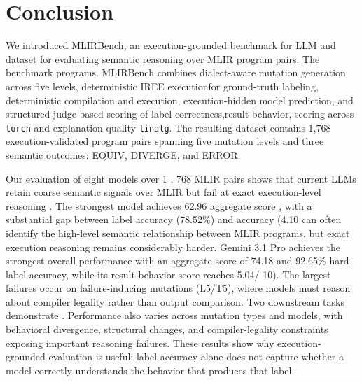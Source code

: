\documentclass[sigplan,screen,review,anonymous]{acmart}
\providecommand{\DIFadd}[1]{{\protect\color{blue} \sf #1}} %
\providecommand{\DIFdel}[1]{{\protect\color{red} \scriptsize #1}} %
\providecommand{\DIFaddbegin}{} %
\providecommand{\DIFaddend}{} %
\providecommand{\DIFdelbegin}{} %
\providecommand{\DIFdelend}{} %
\begin{document}

\DIFaddend \section{Conclusion}

We introduced MLIRBench, an execution-grounded benchmark \DIFdelbegin \DIFdel{for
LLM }\DIFdelend \DIFaddbegin \DIFadd{and dataset for
evaluating }\DIFaddend semantic reasoning over MLIR \DIFdelbegin \DIFdel{program pairs. The benchmark }\DIFdelend \DIFaddbegin \DIFadd{programs. MLIRBench }\DIFaddend combines
dialect-aware mutation generation\DIFdelbegin \DIFdel{across five levels, deterministic IREE executionfor ground-truth labeling}\DIFdelend , \DIFaddbegin \DIFadd{deterministic compilation and execution,
}\DIFaddend execution-hidden model prediction, and structured \DIFdelbegin \DIFdel{judge-based scoring of label correctness,result behavior, }\DIFdelend \DIFaddbegin \DIFadd{scoring across
\texttt{torch} }\DIFaddend and \DIFdelbegin \DIFdel{explanation quality}\DIFdelend \DIFaddbegin \DIFadd{\texttt{linalg}. The resulting dataset contains 1,768
execution-validated program pairs spanning five mutation levels and three
semantic outcomes: \textsc{EQUIV}, \textsc{DIVERGE}, and \textsc{ERROR}}\DIFaddend .

Our evaluation \DIFdelbegin \DIFdel{of eight models over 1}%
\DIFdel{,}%
\DIFdel{768 MLIR pairs }\DIFdelend shows that current LLMs \DIFdelbegin \DIFdel{retain coarse semantic signals over MLIR but fail at
exact execution-level reasoning
. The strongest model achieves 62.96
aggregate score , with a substantial gap between label accuracy (78.52\%) and }%
\DIFdel{accuracy (4.10}\DIFdelend \DIFaddbegin \DIFadd{can often identify the high-level
semantic relationship between MLIR programs, but exact execution reasoning
remains considerably harder. Gemini 3.1 Pro achieves the strongest overall
performance with an aggregate score of 74.18 and 92.65\% hard-label accuracy,
while its result-behavior score reaches 5.04}\DIFaddend /\DIFdelbegin \DIFdel{10).
The largest
failures occur on failure-inducing mutations (L5/T5), where models
must reason about compiler legality rather than output comparison.
Two downstream tasks demonstrate }\DIFdelend \DIFaddbegin \DIFadd{10. Performance also varies across
mutation types and models, with behavioral divergence, structural changes, and
compiler-legality constraints exposing important reasoning failures. These
results show why execution-grounded evaluation is useful: label accuracy alone
does not capture whether a model correctly understands the behavior that
produces that label.
}
\end{document}
